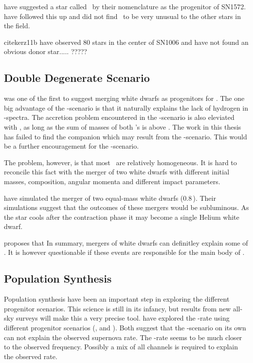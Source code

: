 \citet{2004Natur.431.1069R} have suggested a star called \starg\ by their nomenclature as the progenitor of SN1572. \citep[][chapter \ref{ch:sn1572_starg} of this work and \ref{ch:sn1572_hires}]{2009ApJ...701.1665K, xxx} have followed this up and did not find \starg\ to be very unusual to the other stars in the field. 

citekerz11b have observed 80 stars in the center of SN1006 and have not found an obvious donor star.....
?????
 




\subsection{Double Degenerate Scenario}
\citet{1984ApJ...277..355W} was one of the first to suggest merging white dwarfs as progenitors for \snia. The one big advantage of the \dd-scenario is that it naturally explains the lack of hydrogen in \snia-spectra. The accretion problem encountered in the \sd-scenario is also eleviated with \dd, as long as the sum of masses of both \cowd's is above \mchan. The work in this thesis has failed to find the companion which may result from the \sd-scenario. This would be a further encouragement for the \dd-scenario. 

The problem, however, is that most \snia\ are relatively homogeneous. It is hard to reconcile this fact with the merger of two white dwarfs with different initial masses, composition, angular momenta and different impact parameters. 

\cite{2010Natur.463...61P} have simulated the merger of two equal-mass white dwarfs (0.8\,\msun). Their simulations suggest that the outcomes of these mergers would be subluminous. As the star cools after the contraction phase it may become a single Helium white dwarf.

\cite{2009A&A...493.1081J} proposes that 
In summary, mergers of white dwarfs can definitley explain some of \snia. It is however questionable if these events are responsible for the main body of \sneia. 

\subsection{Population Synthesis}

Population synthesis have been an important step in exploring the different progenitor scenarios. This science is still in its infancy, but results from new all-sky surveys will make this a very precise tool. 
\citet{2009ApJ...699.2026R, 2010A&A...515A..89M} have explored the \snia-rate using different progenitor scenarios (\sd, \dd and \amcvn). Both suggest that the \sd-scenario on its own can not explain the observed supernova rate. The \dd-rate seems to be much closer to the observed frequency. Possibly a mix of all channels is required to explain the observed rate. 



